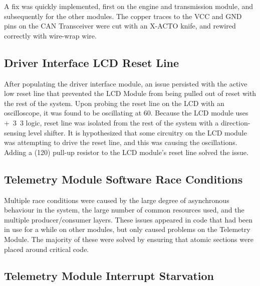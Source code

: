 A fix was quickly implemented, first on the engine and transmission module, and subsequently for the other modules. The copper traces to the VCC and GND pins on the CAN Transceiver were cut with an X-ACTO knife, and rewired correctly with wire-wrap wire.

\subsection{Driver Interface LCD Reset Line}

After populating the driver interface module, an issue persisted with the active low reset line that prevented the LCD Module from being pulled out of reset with the rest of the system. Upon probing the reset line on the LCD with an oscilloscope, it was found to be oscillating at \unit{60}{\mega\hertz}. Because the LCD module uses \unit{+3.3}{\volt} logic, reset line was isolated from the rest of the system with a direction-sensing level shifter. It is hypothesized that some circuitry on the LCD module was attempting to drive the reset line, and this was causing the oscillations. Adding a (\unit{120}{\ohm}) pull-up resistor to the LCD module's reset line solved the issue. 

\subsection{Telemetry Module Software Race Conditions}

Multiple race conditions were caused by the large degree of asynchronous behaviour in the system, the large number of common resources used, and the multiple producer/consumer layers. These issues appeared in code that had been in use for a while on other modules, but only caused problems on the Telemetry Module. The majority of these were solved by ensuring that atomic sections were placed around critical code.

\subsection{Telemetry Module Interrupt Starvation}

